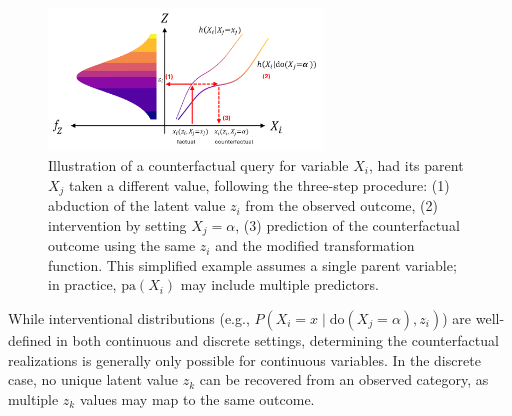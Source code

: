 \begin{figure}[!ht]
\centering
\includegraphics[width=0.65\textwidth]{img/counterfactuals.png}
\caption{Illustration of a counterfactual query for variable $X_i$, had its parent $X_j$ taken a different value, following the three-step procedure: (1) abduction of the latent value $z_i$ from the observed outcome, (2) intervention by setting $X_j = \alpha$, (3) prediction of the counterfactual outcome using the same $z_i$ and the modified transformation function. This simplified example assumes a single parent variable; in practice, $\text{pa}(X_i)$ may include multiple predictors.}
\label{fig:cf_viz}
\end{figure}



While interventional distributions (e.g., $P(X_i = x \mid \text{do}(X_j = \alpha), z_i)$) are well-defined in both continuous and discrete settings, determining the counterfactual realizations is generally only possible for continuous variables. In the discrete case, no unique latent value $z_k$ can be recovered from an observed category, as multiple $z_k$ values may map to the same outcome. 

